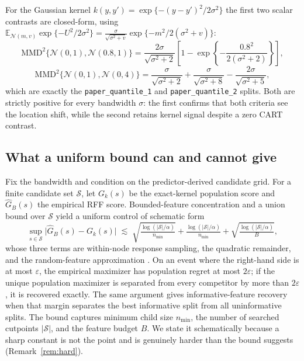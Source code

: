 \documentclass[11pt]{article}
\theoremstyle{remark}
\newcommand{\mmd}{\mathrm{MMD}}
\begin{document}
For the Gaussian kernel $k(y,y')=\exp\{-(y-y')^2/2\sigma^2\}$ the first two
scalar contrasts are closed-form, using
$\mathbb E_{\mathcal N(m,v)}\exp\{-U^2/2\sigma^2\}=
\frac{\sigma}{\sqrt{\sigma^2+v}}\exp\{-m^2/2(\sigma^2+v)\}$:
\[
  \mmd^2\bigl\{\mathcal N(0,1),\mathcal N(0.8,1)\bigr\}
  = \frac{2\sigma}{\sqrt{\sigma^2+2}}
    \left[1-\exp\!\left\{-\frac{0.8^2}{2(\sigma^2+2)}\right\}\right],
\]
\[
  \mmd^2\bigl\{\mathcal N(0,1),\mathcal N(0,4)\bigr\}
  = \frac{\sigma}{\sqrt{\sigma^2+2}}
  + \frac{\sigma}{\sqrt{\sigma^2+8}}
  - \frac{2\sigma}{\sqrt{\sigma^2+5}} ,
\]
which are exactly the \texttt{paper\_quantile\_1} and \texttt{paper\_quantile\_2}
splits.  Both are strictly positive for every bandwidth $\sigma$: the first
confirms that both criteria see the location shift, while the second retains
kernel signal despite a zero CART contrast.

\subsection{What a uniform bound can and cannot give}

Fix the bandwidth and condition on the predictor-derived candidate grid.  For a
finite candidate set $\mathcal S$, let $G_k(s)$ be the exact-kernel population
score and $\widehat G_B(s)$ the empirical RFF score.  Bounded-feature
concentration and a union bound over $\mathcal S$ yield a uniform control of
schematic form
\[
  \sup_{s\in\mathcal S}\bigl|\widehat G_B(s)-G_k(s)\bigr|
  \;\lesssim\;
  \sqrt{\tfrac{\log(|\mathcal S|/\alpha)}{n_{\min}}}
  + \tfrac{\log(|\mathcal S|/\alpha)}{n_{\min}}
  + \sqrt{\tfrac{\log(|\mathcal S|/\alpha)}{B}},
\]
whose three terms are within-node response sampling, the quadratic remainder, and
the random-feature approximation \citep{rahimi2007,gretton2012}.  On an event
where the right-hand side is at most $\varepsilon$, the empirical maximizer has
population regret at most $2\varepsilon$; if the unique population maximizer is
separated from every competitor by more than $2\varepsilon$, it is recovered
exactly.  The same argument gives informative-feature recovery when that margin
separates the best informative split from all uninformative splits.  The bound
captures minimum child size $n_{\min}$, the number of searched cutpoints
$|\mathcal S|$, and the feature budget $B$.  We state it schematically because a
sharp constant is not the point and is genuinely harder than the bound suggests
(Remark~\ref{rem:hard}).
\end{document}

